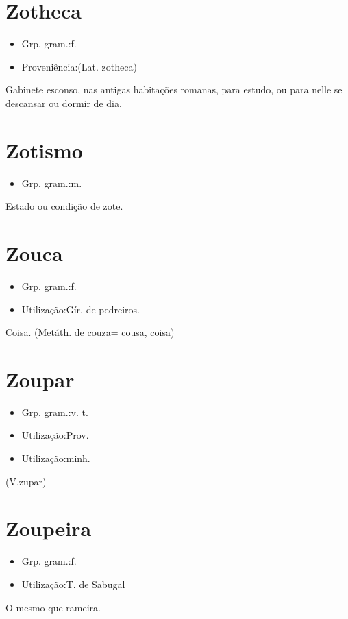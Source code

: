 \section{Zotheca}
\begin{itemize}
\item {Grp. gram.:f.}
\end{itemize}
\begin{itemize}
\item {Proveniência:(Lat. \textunderscore zotheca\textunderscore )}
\end{itemize}
Gabinete esconso, nas antigas habitações romanas, para estudo, ou para nelle se descansar ou dormir de dia.
\section{Zotismo}
\begin{itemize}
\item {Grp. gram.:m.}
\end{itemize}
Estado ou condição de zote.
\section{Zouca}
\begin{itemize}
\item {Grp. gram.:f.}
\end{itemize}
\begin{itemize}
\item {Utilização:Gír. de pedreiros.}
\end{itemize}
Coisa.
(Metáth. de \textunderscore couza\textunderscore  = \textunderscore cousa\textunderscore , \textunderscore coisa\textunderscore )
\section{Zoupar}
\begin{itemize}
\item {Grp. gram.:v. t.}
\end{itemize}
\begin{itemize}
\item {Utilização:Prov.}
\end{itemize}
\begin{itemize}
\item {Utilização:minh.}
\end{itemize}
(V.zupar)
\section{Zoupeira}
\begin{itemize}
\item {Grp. gram.:f.}
\end{itemize}
\begin{itemize}
\item {Utilização:T. de Sabugal}
\end{itemize}
O mesmo que \textunderscore rameira\textunderscore .
